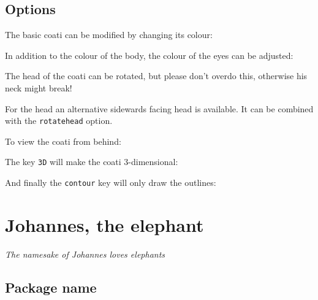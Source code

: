 \documentclass[parskip=half]{scrartcl}
\begin{document}
\subsection{Options}

The basic coati can be modified by changing its colour:
\begin{tcblisting}{}
\coati[body=blue]
\end{tcblisting}

In addition to the colour of the body, the colour of the eyes can be adjusted:
\begin{tcblisting}{}
\coati[eye=red]
\end{tcblisting}

The head of the coati can be rotated, but please don't overdo this, otherwise his neck might break!
\begin{tcblisting}{}
\coati[rotatehead=-15]
\end{tcblisting}

For the head an alternative sidewards facing head is available. It can be combined with the \lstinline|rotatehead| option.
\begin{tcblisting}{}
\coati[sideward]
\end{tcblisting}

To view the coati from behind:
\begin{tcblisting}{}
\coati[back]
\end{tcblisting}

The key \lstinline|3D| will make the coati 3-dimensional:
\begin{tcblisting}{}
\coati[3D]
\end{tcblisting}

And finally the \lstinline|contour| key will only draw the outlines:
\begin{tcblisting}{}
\coati[contour=black]
\end{tcblisting}

%
%
\clearpage
\section[Elephant]{Johannes, the elephant}

\emph{The namesake of Johannes loves elephants}

\subsection{Package name}
\end{document}
